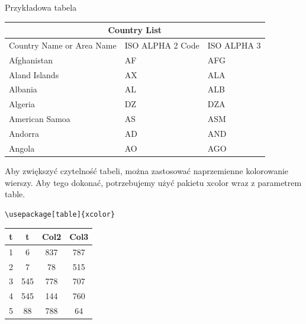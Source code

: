 \documentclass[table]{beamer}
\begin{document}
\begin{frame}

\setlength{\arrayrulewidth}{1mm}
\setlength{\tabcolsep}{15pt}
\renewcommand{\arraystretch}{1.1}

\centering
Przykładowa tabela

\begin{center}


\begin{tabular}{ |p{2.2cm}|p{2.2cm}|p{2.2cm}|  }
\hline
\multicolumn{3}{|c|}{Country List} \\
\hline
Country Name     or Area Name& ISO ALPHA 2 Code &ISO ALPHA 3 \\
\hline
Afghanistan & AF &AFG \\
Aland Islands & AX   & ALA \\
Albania &AL & ALB \\
Algeria    &DZ & DZA \\
American Samoa & AS & ASM \\
Andorra & AD & AND   \\
Angola & AO & AGO \\
\hline
\end{tabular}
\end{center}

\end{frame}

\begin{frame}[fragile]
Aby zwiększyć czytelność tabeli, można zastosować naprzemienne kolorowanie wierszy. Aby tego dokonać, potrzebujemy użyć pakietu xcolor wraz z parametrem table.
\begin{verbatim}
\usepackage[table]{xcolor}
\end{verbatim}

\begin{center}
\setlength{\arrayrulewidth}{1mm}
{
	\begin{tabular}{| c | c | c | c |} 
 		\hline
 		t & t & Col2 & Col3 \\ 
 		\hline \hline
 		\rowcolor{lightgray} 1 & 6 & 837 & 787 \\ 
		2 & 7 & 78 & 515 \\
 		3 & 545 & 778 & 707 \\
 		4 & 545 & \cellcolor{blue} 144 & 760 \\
 		5 & 88 & 788 & 64 \\ 
 		\hline
 	
 	\end{tabular}
}
\end{center}

\end{frame}
\end{document}
